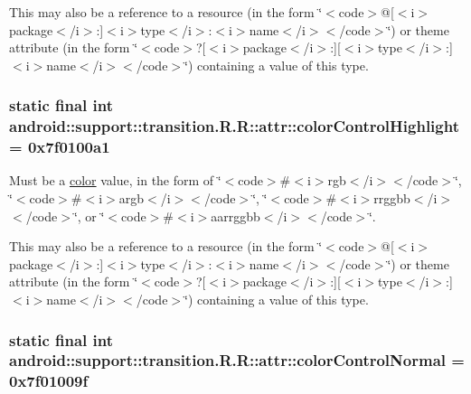 This may also be a reference to a resource (in the form \char`\"{}$<$code$>$@\mbox{[}$<$i$>$package$<$/i$>$:\mbox{]}$<$i$>$type$<$/i$>$:$<$i$>$name$<$/i$>$$<$/code$>$\char`\"{}) or theme attribute (in the form \char`\"{}$<$code$>$?\mbox{[}$<$i$>$package$<$/i$>$:\mbox{]}\mbox{[}$<$i$>$type$<$/i$>$:\mbox{]}$<$i$>$name$<$/i$>$$<$/code$>$\char`\"{}) containing a value of this type. \hypertarget{classandroid_1_1support_1_1transition_1_1_r_1_1attr_6e7516e27d946740d5fe85ca928df605}{
\subsubsection[{colorControlHighlight}]{\setlength{\rightskip}{0pt plus 5cm}static final int android::support::transition.R.R::attr::colorControlHighlight = 0x7f0100a1}}
\label{classandroid_1_1support_1_1transition_1_1_r_1_1attr_6e7516e27d946740d5fe85ca928df605}


Must be a \hyperlink{classandroid_1_1support_1_1transition_1_1_r_1_1color}{color} value, in the form of \char`\"{}$<$code$>$\#$<$i$>$rgb$<$/i$>$$<$/code$>$\char`\"{}, \char`\"{}$<$code$>$\#$<$i$>$argb$<$/i$>$$<$/code$>$\char`\"{}, \char`\"{}$<$code$>$\#$<$i$>$rrggbb$<$/i$>$$<$/code$>$\char`\"{}, or \char`\"{}$<$code$>$\#$<$i$>$aarrggbb$<$/i$>$$<$/code$>$\char`\"{}. 

This may also be a reference to a resource (in the form \char`\"{}$<$code$>$@\mbox{[}$<$i$>$package$<$/i$>$:\mbox{]}$<$i$>$type$<$/i$>$:$<$i$>$name$<$/i$>$$<$/code$>$\char`\"{}) or theme attribute (in the form \char`\"{}$<$code$>$?\mbox{[}$<$i$>$package$<$/i$>$:\mbox{]}\mbox{[}$<$i$>$type$<$/i$>$:\mbox{]}$<$i$>$name$<$/i$>$$<$/code$>$\char`\"{}) containing a value of this type. \hypertarget{classandroid_1_1support_1_1transition_1_1_r_1_1attr_ec83bfa52774b6e79e3f126c7ae58a22}{
\subsubsection[{colorControlNormal}]{\setlength{\rightskip}{0pt plus 5cm}static final int android::support::transition.R.R::attr::colorControlNormal = 0x7f01009f}}
\label{classandroid_1_1support_1_1transition_1_1_r_1_1attr_ec83bfa52774b6e79e3f126c7ae58a22}


